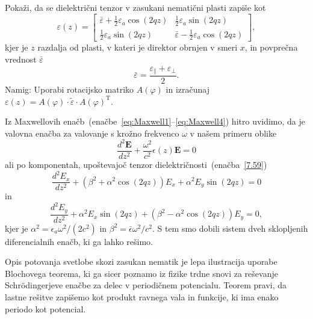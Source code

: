 \begin{definition}
Pokaži, da se dielektrični tenzor v zasukani nematični plasti zapiše kot
\begin{equation}
\varepsilon (z)=\left[\begin{array}{cc}
\bar{\varepsilon}+\frac{1}{2}\varepsilon_{a}\cos(2qz) & \frac{1}{2}\varepsilon_{a}\sin(2qz)\\
\frac{1}{2}\varepsilon_{a}\sin(2qz) & \bar{\varepsilon}-\frac{1}{2}\varepsilon_{a}\cos(2qz)
\end{array}\right],
\label{7.59}
\end{equation}
kjer  je $z$ razdalja od plasti, v kateri je direktor
obrnjen v smeri $x$, in povprečna vrednost $\bar{\varepsilon}$ 
\begin{equation}
\bar{\varepsilon}=\frac{\varepsilon_{\parallel}+\varepsilon_{\perp}}{2}.
\label{7.60}
\end{equation}
Namig: Uporabi rotacijsko matriko $A(\varphi)$ in izračunaj  $\varepsilon (z) = A(\varphi) \cdot 
\tilde{\varepsilon} \cdot A(\varphi)^\mathrm{T}$.
\end{definition}

Iz Maxwellovih enačb~(enačbe~\ref{eq:Maxwell1}--\ref{eq:Maxwell4}) 
hitro uvidimo, da je valovna enačba
za valovanje s krožno frekvenco $\omega$ v našem primeru oblike
\begin{equation}
\frac{d^{2}\mathbf{E}}{dz^{2}}+\frac{\omega^{2}}{c^{2}} \epsilon
(z)\mathbf{E}=0
\label{7.61}
\end{equation}
ali po komponentah, upoštevajoč tenzor dielektričnosti~(enačba~\ref{7.59})
\begin{equation}
\frac{d^{2}E_{x}}{dz^{2}} + 
(\beta^{2}+\alpha^{2}\cos(2qz))E_{x}+\alpha^{2}E_{y}\sin(2qz) = 0
\label{7.62a}
\end{equation}
in 
\begin{equation}
\frac{d^{2}E_{y}}{dz^{2}} +
\alpha^{2}E_{x}\sin(2qz)+(\beta^{2}-\alpha^{2}\cos(2qz))E_{y} = 0,
\label{7.62b}
\end{equation}
kjer je $\alpha^{2}=\epsilon_{a}\omega^{2}/(2c^{2})$ in 
$\beta^{2}=\bar{\epsilon}\omega^{2}/c^{2}$. S tem smo dobili sistem
dveh sklopljenih diferencialnih enačb, ki ga lahko rešimo.
\begin{remark}
Opis potovanja svetlobe skozi zasukan nematik je lepa ilustracija uporabe 
Blochovega teorema, ki ga sicer poznamo iz fizike trdne snovi za 
reševanje Schr\"odingerjeve enačbe za delec v periodičnem potencialu. Teorem pravi, 
da lastne rešitve zapišemo kot produkt ravnega vala in funkcije, ki ima enako 
periodo kot potencial.
\end{remark}

